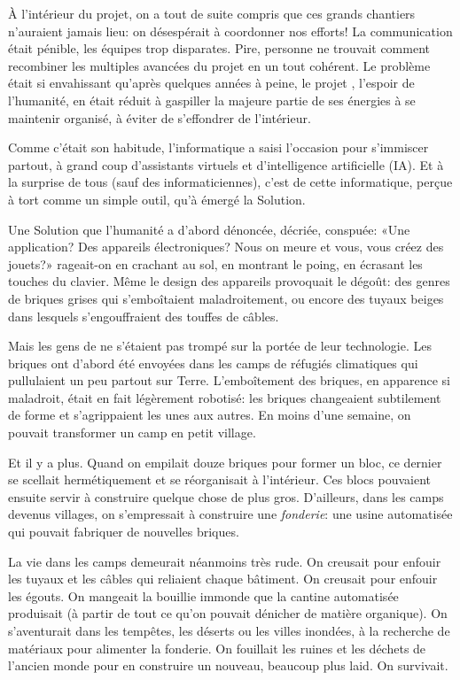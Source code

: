 À l'intérieur du projet, on a tout de suite compris que ces grands chantiers
n'auraient jamais lieu: on désespérait à coordonner nos efforts! La
communication était pénible, les équipes trop disparates. Pire, personne ne
trouvait comment recombiner les multiples avancées du projet en un tout
cohérent.  Le problème était si envahissant qu'après quelques années à peine,
le projet \nomProjet{}, l'espoir de l'humanité, en était réduit à gaspiller la
majeure partie de ses énergies à se maintenir organisé, à éviter de s'effondrer
de l'intérieur.  

Comme c'était son habitude, l'informatique a saisi l'occasion
pour s'immiscer partout, à grand coup d'assistants virtuels et d'intelligence
artificielle (IA).  Et à la surprise de tous (sauf des informati\-ciennes),
c'est de cette informatique, perçue à tort comme un simple outil, qu'à
émergé la Solution.

Une Solution que l'humanité a d'abord dénoncée, décriée, conspuée: «Une
application? Des appareils électroniques? Nous on meure et vous, vous créez des
jouets?» rageait-on en crachant au sol, en montrant le poing, en écrasant
les touches du clavier.  Même le design des appareils provoquait le
dégoût: des genres de briques grises qui s'emboîtaient mala\-droi\-tement, ou
encore des tuyaux beiges dans lesquels s'engouffraient des touffes
de câbles.


Mais les gens de \nomProjet{} ne s'étaient pas trompé sur la portée de
leur technologie.
Les briques ont d'abord été envoyées dans les
camps de réfugiés climatiques qui pullu\-laient un peu partout sur Terre.
L'emboît\-e\-ment des briques, en apparence si maladroit,
était en fait légèrement robotisé: les briques changeaient subtilement de
forme et s'a\-grip\-paient les unes aux autres. En moins d'une semaine, on
pouvait transfor\-mer un camp en petit village.

Et il y a plus. Quand on empilait douze briques pour former un bloc, ce
dernier se scellait hermétiquement et se réorganisait à l'intérieur. Ces
blocs pouvaient ensuite servir à construire quelque chose de plus gros.
D'ailleurs, dans les camps devenus villages, on
s'empressait à construire une \textit{fonderie}: une usine automatisée qui
pouvait fabriquer de nouvelles briques.

La vie dans les camps demeurait néanmoins très rude. On creusait pour
enfouir les tuyaux et les câbles qui reliaient chaque bâtiment. On creusait
pour enfouir les égouts.  On mangeait la bouillie immonde que la cantine
automatisée produisait (à partir de tout ce qu'on pouvait dénicher de
matière organique).  On s'aven\-turait dans les tempêtes, les déserts ou
les villes inondées, à la recherche de matériaux pour alimenter la
fonderie.  On fouillait les ruines et les déchets de l'ancien monde pour en
construire un nouveau, beaucoup plus laid.
On survivait.


